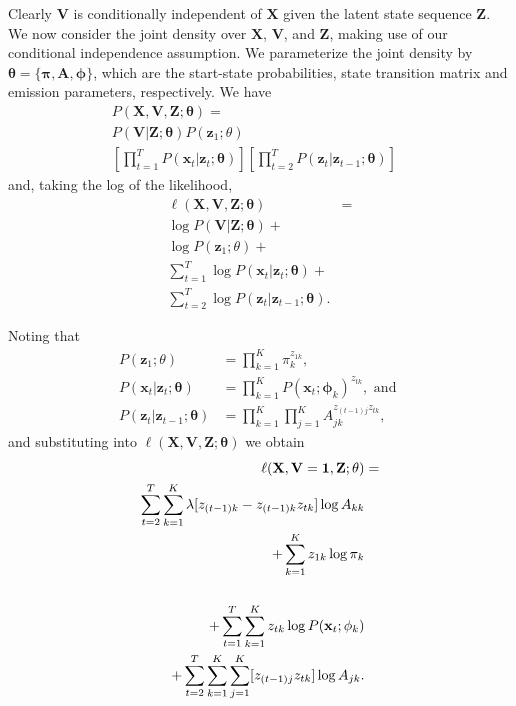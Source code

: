Clearly $\mathbf{V}$ is conditionally independent of $\mathbf{X}$ given the latent state sequence $\mathbf{Z}$. We now consider the joint density over $\mathbf{X}$, $\mathbf{V}$, and $\mathbf{Z}$, making use of our conditional independence assumption. We parameterize the joint density by $\mathbf{\theta} = \{\mathbf{\pi},\mathbf{A}, \mathbf{\phi}\}$, which are the start-state probabilities, state transition matrix and emission parameters, respectively. We have
\begin{align*}
    P(\mathbf{X}, \mathbf{V}, \mathbf{Z} ; \mathbf{\theta}) =&\\
    P(\mathbf{V}|\mathbf{Z}; \mathbf{\theta}) P(\mathbf{z}_{1} ; \theta) \\\left[\prod_{t=1}^{T}P(\mathbf{x}_t|\mathbf{z}_t; \mathbf{\theta})\right]\left[\prod_{t=2}^{T}P(\mathbf{z}_t|\mathbf{z}_{t-1}; \mathbf{\theta})\right]
\end{align*}
and, taking the log of the likelihood,
\begin{align*}
    \ell(\mathbf{X}, \mathbf{V}, \mathbf{Z} ; \mathbf{\theta}) 
    &=\\ \log P(\mathbf{V}|\mathbf{Z}; \mathbf{\theta}) +\\ \log P(\mathbf{z}_{1}; \theta) +\\ \sum_{t=1}^{T}\log P(\mathbf{x}_t|\mathbf{z}_t; \mathbf{\theta}) +\\ \sum_{t=2}^{T}\log P(\mathbf{z}_t|\mathbf{z}_{t-1};\mathbf{\theta}).
\end{align*}

Noting that 
\begin{align*}
    P(\mathbf{z}_{1}; \theta) &= \prod_{k=1}^{K}\pi_{k}^{z_{1k}}, \\
    P(\mathbf{x}_t|\mathbf{z}_t; \mathbf{\theta}) &= \prod_{k=1}^{K} P(\mathbf{x}_t ; \mathbf{\phi}_k)^{z_{tk}},\text{ and }\\ 
    P(\mathbf{z}_t|\mathbf{z}_{t-1}; \mathbf{\theta}) &= \prod_{k=1}^{K}\prod_{j=1}^{K}A_{jk}^{z_{(t-1)j}z_{tk}},
\end{align*}
and substituting into $\ell(\mathbf{X}, \mathbf{V}, \mathbf{Z} ; \mathbf{\theta})$ we obtain
\begin{align*}
    \ell(\mathbf{X}, \mathbf{V}=\mathbf{1}, \mathbf{Z} ; \mathbf{\theta}) 
    &=\\ \sum^{T}_{t=2}\sum^{K}_{k=1}\lambda[z_{(t-1)k} - z_{(t-1)k}z_{tk}]\log A_{kk} \\+ \sum_{k=1}^{K}{z_{1k}}\log \pi_{k} \notag\\
   \\+ \sum_{t=1}^{T}\sum_{k=1}^{K} z_{tk}\log P(\mathbf{x}_t ; \mathbf{\phi}_k) \\+ \sum_{t=2}^{T}\sum_{k=1}^{K}\sum_{j=1}^{K}[z_{(t-1)j}z_{tk}]\log A_{jk}.
\end{align*}

